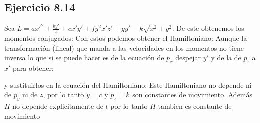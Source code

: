 \subsection*{Ejercicio 8.14}
Sea $L=a x'^2+\frac{b y'}{x}+c x' y'+ f y^2x' z' +g y'-k \sqrt{x^2+y^2}$. De este obtenemos los momentos conjugados:
Con estos podemos obtener el Hamiltoniano:
Aunque la transformaci\'on (lineal) que manda a las velocidades en los momentos no tiene inversa lo que si se puede hacer es de la ecuaci\'on de $p_x$ despejar $y'$ y de la de $p_z$ a $x'$ para obtener:

y sustituirlos en la ecuaci\'on del Hamiltoniano:
Este Hamiltoniano no depende ni de $p_y$ ni de $z$, por lo tanto $y=c$ y $p_z=k$ son constantes de movimiento. Adem\'as $H$ no depende explicitamente de $t$ por lo tanto $H$ tambien es constante de movimiento


